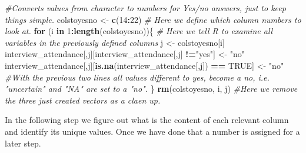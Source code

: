 \documentclass[12pt, krantz2,]{krantz}
\makeatletter
\newenvironment{Shaded}{\begin{snugshade}}{\end{snugshade}}
\newcommand{\CommentTok}[1]{\textcolor[rgb]{0.37,0.37,0.37}{\textit{#1}}}
\newcommand{\ControlFlowTok}[1]{\textcolor[rgb]{0.27,0.27,0.27}{\textbf{#1}}}
\newcommand{\DataTypeTok}[1]{\textcolor[rgb]{0.27,0.27,0.27}{#1}}
\newcommand{\DecValTok}[1]{\textcolor[rgb]{0.06,0.06,0.06}{#1}}
\newcommand{\KeywordTok}[1]{\textcolor[rgb]{0.27,0.27,0.27}{\textbf{#1}}}
\newcommand{\NormalTok}[1]{#1}
\newcommand{\OperatorTok}[1]{\textcolor[rgb]{0.43,0.43,0.43}{\textbf{#1}}}
\newcommand{\OtherTok}[1]{\textcolor[rgb]{0.37,0.37,0.37}{#1}}
\newcommand{\StringTok}[1]{\textcolor[rgb]{0.5,0.5,0.5}{#1}}
\newenvironment{kframe}{%
\medskip{}
\setlength{\fboxsep}{.8em}
 \def\at@end@of@kframe{}%
 \ifinner\ifhmode%
  \def\at@end@of@kframe{\end{minipage}}%
  \begin{minipage}{\columnwidth}%
 \fi\fi%
 \def\FrameCommand##1{\hskip\@totalleftmargin \hskip-\fboxsep
 \colorbox{shadecolor}{##1}\hskip-\fboxsep
     \hskip-\linewidth \hskip-\@totalleftmargin \hskip\columnwidth}%
 \MakeFramed {\advance\hsize-\width
   \@totalleftmargin\z@ \linewidth\hsize
   \@setminipage}}%
 {\par\unskip\endMakeFramed%
 \at@end@of@kframe}
\renewenvironment{Shaded}{\begin{kframe}}{\end{kframe}}
\makeatother
\begin{document}
\begin{Shaded}
\begin{Highlighting}[]
\CommentTok{#Converts values from character to numbers for Yes/no answers, just to keep things simple.}
\NormalTok{  colstoyesno <-}\StringTok{ }\KeywordTok{c}\NormalTok{(}\DecValTok{14}\OperatorTok{:}\DecValTok{22}\NormalTok{) }\CommentTok{# Here we define which column numbers to look at.}
\ControlFlowTok{for}\NormalTok{ (i }\ControlFlowTok{in} \DecValTok{1}\OperatorTok{:}\KeywordTok{length}\NormalTok{(colstoyesno))\{   }\CommentTok{# Here we tell R to examine all variables in the previously defined columns}
\NormalTok{  j <-}\StringTok{ }\NormalTok{colstoyesno[i]}
\NormalTok{  interview_attendance[,j][interview_attendance[,j] }\OperatorTok{!=}\StringTok{"yes"}\NormalTok{] <-}\StringTok{ "no"}   
\NormalTok{  interview_attendance[,j][}\KeywordTok{is.na}\NormalTok{(interview_attendance[,j]) }\OperatorTok{==}\StringTok{ }\OtherTok{TRUE}\NormalTok{] <-}\StringTok{ "no"}
  \CommentTok{#With the previous two lines all values different to yes, become a no, i.e. "uncertain" and "NA" are set to a "no".}
\NormalTok{\}}
\KeywordTok{rm}\NormalTok{(colstoyesno, i, j) }\CommentTok{#Here we remove the three just created vectors as a claen up.}
\end{Highlighting}
\end{Shaded}

In the following step we figure out what is the content of each relevant column and identify its unique values. Once we have done that a number is assigned for a later step.

\begin{Shaded}
\end{Shaded}
\end{document}
